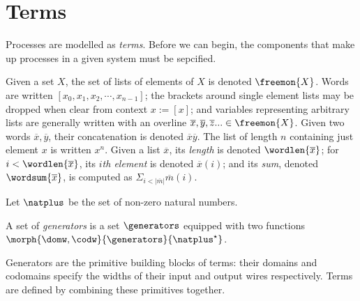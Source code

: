 \section{Terms}

Processes are modelled as \emph{terms}.
Before we can begin, the components that make up processes in a given system
must be sepcified.

\begin{notation}
    Given a set \(X\), the set of lists of elements of \(X\) is denoted
    \(\freemon{X}\).
    Words are written \([x_0, x_1, x_2, \cdots, x_{n-1}]\); the brackets around
    single element lists may be dropped when clear from context \(x := [x]\);
    and variables representing arbitrary lists are generally written with an
    overline \(
        \overline{x}, \overline{y}, \overline{z}... \in \freemon{X}
    \).
    Given two words \(\overline{x}, \overline{y}\), their concatenation is
    denoted \(\overline{x}\overline{y}\).
    The list of length \(n\) containing just element \(x\) is written \(x^n\).
    Given a list \(\overline{x}\), its \emph{length} is denoted
    \(\wordlen{\overline{x}}\); for \(i < \wordlen{\overline{x}}\), its
    \(i\)\emph{th element} is denoted \(\overline{x}(i)\); and its
    \emph{sum}, denoted \(\wordsum{\overline{x}}\), is computed as
    \(\Sigma_{i < |\overline{m}|}\overline{m}(i)\).
\end{notation}

\begin{notation}
    Let \(\natplus\) be the set of non-zero natural numbers.
\end{notation}

\begin{definition}[Generators]
    A set of \emph{generators} is a set \(\generators\) equipped with two
    functions \(\morph{\domw,\codw}{\generators}{\natplus^\star}\).
\end{definition}

Generators are the primitive building blocks of terms: their domains and
codomains specify the widths of their input and output wires respectively.
Terms are defined by combining these primitives together.

